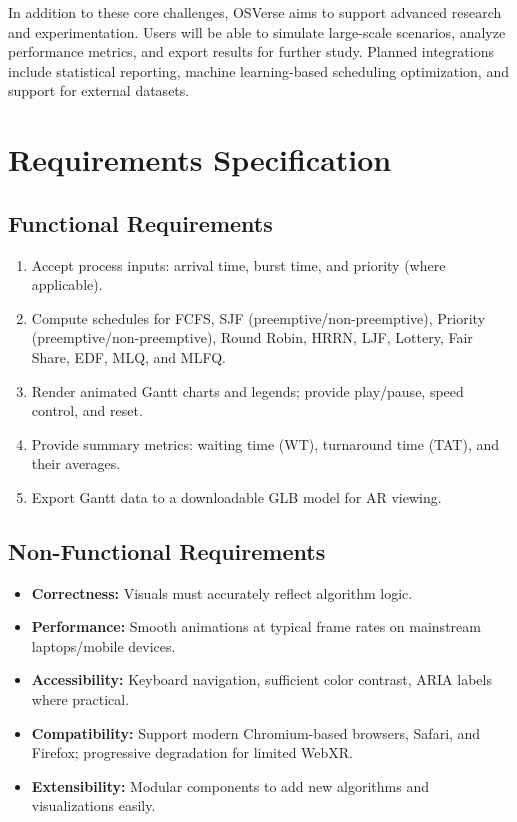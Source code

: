 \documentclass[12pt,a4paper,oneside]{report}
\begin{document}
In addition to these core challenges, OSVerse aims to support advanced research and experimentation. Users will be able to simulate large-scale scenarios, analyze performance metrics, and export results for further study. Planned integrations include statistical reporting, machine learning-based scheduling optimization, and support for external datasets.

\section{Requirements Specification}
\subsection*{Functional Requirements}
\begin{enumerate}
  \item Accept process inputs: arrival time, burst time, and priority (where applicable).
  \item Compute schedules for FCFS, SJF (preemptive/non-preemptive), Priority (preemptive/non-preemptive), Round Robin, HRRN, LJF, Lottery, Fair Share, EDF, MLQ, and MLFQ.
  \item Render animated Gantt charts and legends; provide play/pause, speed control, and reset.
  \item Provide summary metrics: waiting time (WT), turnaround time (TAT), and their averages.
  \item Export Gantt data to a downloadable GLB model for AR viewing.
\end{enumerate}

\subsection*{Non-Functional Requirements}
\begin{itemize}
  \item \textbf{Correctness:} Visuals must accurately reflect algorithm logic.
  \item \textbf{Performance:} Smooth animations at typical frame rates on mainstream laptops/mobile devices.
  \item \textbf{Accessibility:} Keyboard navigation, sufficient color contrast, ARIA labels where practical.
  \item \textbf{Compatibility:} Support modern Chromium-based browsers, Safari, and Firefox; progressive degradation for limited WebXR.
  \item \textbf{Extensibility:} Modular components to add new algorithms and visualizations easily.
\end{itemize}
\end{document}
